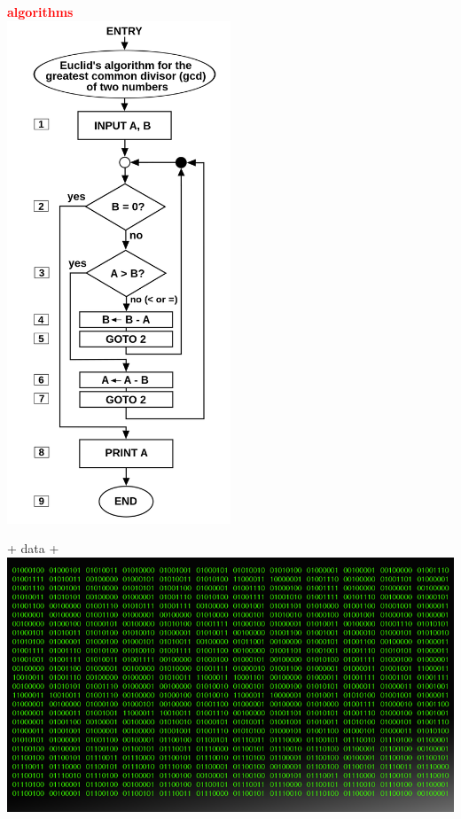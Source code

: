 \documentclass[12pt]{beamer}
\begin{document}
\begin{frame}[allowframebreaks]
\begin{minipage}[t]{0.2\textwidth}
\centering
\textbf{\textcolor{red}{algorithms}}
\\
\includegraphics[width=0.5\textwidth]{Figures/algorithm.png} 
\end{minipage} 
\begin{minipage}[t]{0.2\textwidth}
\centering
+ data + 
\\\vskip 0.2cm
\includegraphics[width=\textwidth]{Figures/data.png} 
\end{minipage} 
\begin{minipage}[t]{0.2\textwidth}

\end{minipage}
\end{frame}
\end{document}
